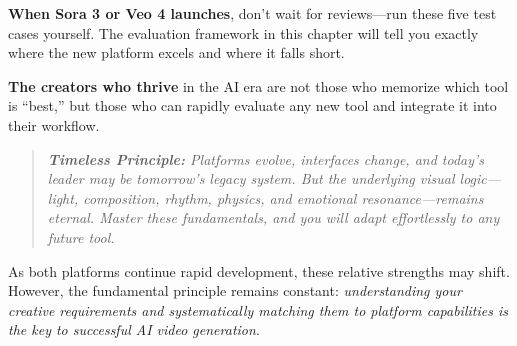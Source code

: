 \begin{resultbox}
\textbf{When Sora 3 or Veo 4 launches}, don't wait for reviews---run these five test cases yourself. The evaluation framework in this chapter will tell you exactly where the new platform excels and where it falls short.

\textbf{The creators who thrive} in the AI era are not those who memorize which tool is ``best,'' but those who can rapidly evaluate any new tool and integrate it into their workflow.
\end{resultbox}

\begin{quote}
\textit{\textbf{Timeless Principle:} Platforms evolve, interfaces change, and today's leader may be tomorrow's legacy system. But the underlying visual logic---light, composition, rhythm, physics, and emotional resonance---remains eternal. Master these fundamentals, and you will adapt effortlessly to any future tool.}
\end{quote}

As both platforms continue rapid development, these relative strengths may shift. However, the fundamental principle remains constant: \textit{understanding your creative requirements and systematically matching them to platform capabilities is the key to successful AI video generation}.


